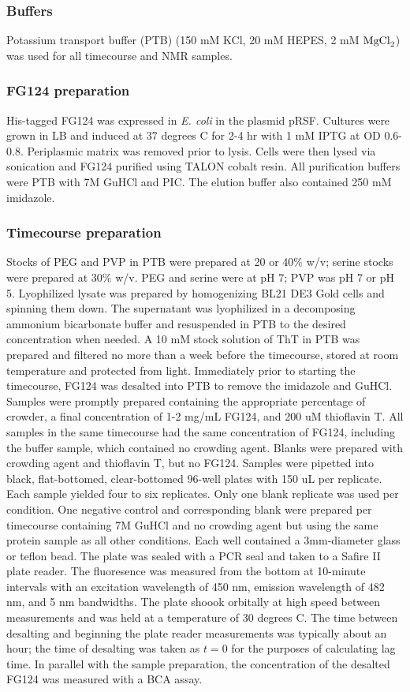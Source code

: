 \subsubsection{Buffers} Potassium transport buffer (PTB) (150 mM KCl, 20 mM HEPES, 2 mM $\mathrm{MgCl}_2$) was used for all timecourse and NMR samples.

\subsubsection{FG124 preparation} His-tagged FG124 was expressed in \emph{E. coli} in the plasmid pRSF.  Cultures were grown in LB and  induced at 37 degrees C for 2-4 hr with 1 mM IPTG at OD 0.6-0.8.  Periplasmic matrix was removed prior to lysis.  Cells were then lysed via sonication and FG124 purified using TALON cobalt resin.  All purification buffers were PTB with 7M GuHCl and PIC.  The elution buffer also contained 250 mM imidazole.

\subsubsection{Timecourse preparation} Stocks of PEG and PVP in PTB were prepared at 20 or 40\% w/v; serine stocks were prepared at 30\% w/v.  PEG and serine were at pH 7; PVP was pH 7 or pH 5.  Lyophilized lysate was prepared by homogenizing BL21 DE3 Gold cells and spinning them down.  The supernatant was lyophilized in a decomposing ammonium bicarbonate buffer and resuspended in PTB to the desired concentration when needed.  A 10 mM stock solution of ThT in PTB was prepared and filtered no more than a week before the timecourse, stored at room temperature and protected from light.  Immediately prior to starting the timecourse, FG124 was desalted into PTB to remove the imidazole and GuHCl.  Samples were promptly prepared containing the appropriate percentage of crowder, a final concentration of 1-2 mg/mL FG124, and 200 uM thioflavin T.  All samples in the same timecourse had the same concentration of FG124, including the buffer sample, which contained no crowding agent.  Blanks were prepared with crowding agent and thioflavin T, but no FG124.  Samples were pipetted into black, flat-bottomed, clear-bottomed 96-well plates with 150 uL per replicate.  Each sample yielded four to six replicates.  Only one blank replicate was used per condition.  One negative control and corresponding blank were prepared per timecourse containing 7M GuHCl and no crowding agent but using the same protein sample as all other conditions.  Each well contained a 3mm-diameter glass or teflon bead.  The plate was sealed with a PCR seal and taken to a Safire II plate reader.  The fluoresence was measured from the bottom at 10-minute intervals with an excitation wavelength of 450 nm, emission wavelength of 482 nm, and 5 nm bandwidths.  The plate shoook orbitally at high speed between measurements and was held at a temperature of 30 degrees C.  The time between desalting and beginning the plate reader measurements was typically about an hour; the time of desalting was taken as $t=0$ for the purposes of calculating lag time. In parallel with the sample preparation, the concentration of the desalted FG124 was measured with a BCA assay.

